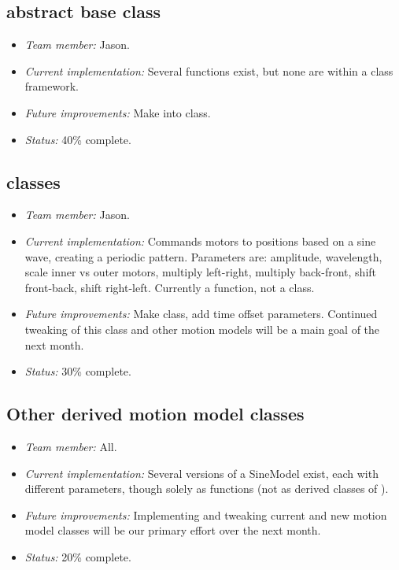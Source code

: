 \subsection*{ abstract base class}

\begin{itemize}
\item \emph{Team member:} Jason.
\item \emph{Current implementation:} Several functions exist, but none are within a class framework.
\item \emph{Future improvements:} Make into class.
\item \emph{Status:} 40\% complete.
\end{itemize}



\subsection*{ classes}

\begin{itemize}
\item \emph{Team member:} Jason.
\item \emph{Current implementation:} Commands motors to positions
  based on a sine wave, creating a periodic pattern. Parameters are:
  amplitude, wavelength, scale inner vs outer motors, multiply
  left-right, multiply back-front, shift front-back, shift right-left.
  Currently a function, not a class.
\item \emph{Future improvements:} Make class, add time offset
  parameters.  Continued tweaking of this class and other motion
  models will be a main goal of the next month.
\item \emph{Status:} 30\% complete.
\end{itemize}



\subsection*{Other derived motion model classes}

\begin{itemize}
\item \emph{Team member:} All.
\item \emph{Current implementation:} Several versions of a SineModel
  exist, each with different parameters, though solely as functions
  (not as derived classes of ).
\item \emph{Future improvements:} Implementing and tweaking current
  and new motion model classes will be our primary effort over the
  next month.
\item \emph{Status:} 20\% complete.
\end{itemize}



